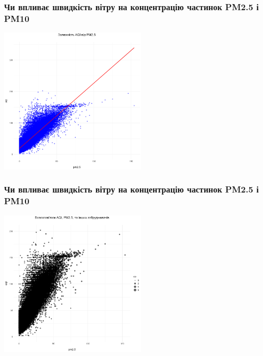 \documentclass{beamer}
\begin{document}
\begin{frame}
  \frametitle{Чи впливає швидкість вітру на концентрацію частинок PM2.5 і PM10}

  \begin{center}
    \includegraphics[height=2.8in]{plots/question1/aqi_pm2_5_diagram.png}
  \end{center}
\end{frame}

\begin{frame}
  \frametitle{Чи впливає швидкість вітру на концентрацію частинок PM2.5 і PM10}

  \begin{center}
    \includegraphics[height=2.8in]{plots/question1/aqi_pm_polutants.png}
  \end{center}
\end{frame}
\end{document}

